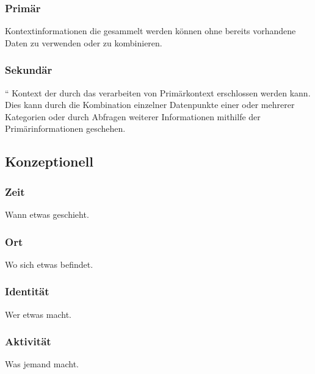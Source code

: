 \subsubsection{Primär}

Kontextinformationen die gesammelt werden können ohne bereits vorhandene Daten zu verwenden oder zu kombinieren. \cite{perera_context_2014} 

\subsubsection{Sekundär}
“%
Kontext der durch das verarbeiten von Primärkontext erschlossen werden kann. Dies kann durch die Kombination einzelner Datenpunkte einer oder mehrerer Kategorien oder durch Abfragen weiterer Informationen mithilfe der Primärinformationen geschehen.

\subsection{Konzeptionell}
\subsubsection{Zeit}
Wann etwas geschieht.
\subsubsection{Ort}
Wo sich etwas befindet.
\subsubsection{Identität}
Wer etwas macht.
\subsubsection{Aktivität}
Was jemand macht.
